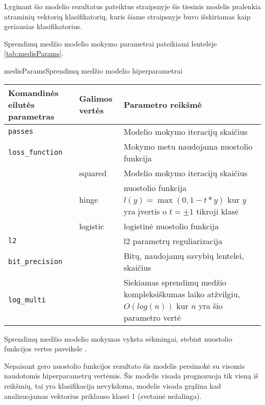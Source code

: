 
Lyginant šio modelio rezultatus pateiktus \cite{comp} straipsnyje šis tiesinis modelis pralenkia
atraminių vektorių klasifikatorių, kuris šiame straipsnyje buvo išskiriamas kaip geriausias klasifikatorius.



Sprendimų medžio modelio mokymo parametrai pateikiami lentelėje \vref{tab:medisParams}.

\begin{ktutable}{medisParams}{Sprendimų medžio modelio hiperparametrai}
    \begin{tabular}{| l | l | p{7cm}|}
    \hline
        Komandinės eilutės parametras & Galimos vertės & Parametro reikšmė\\ \hline
        \texttt{passes} &  & Modelio mokymo iteracijų skaičius \\ \hline
        \texttt{loss\_function} &          & Mokymo metu naudojama nuostolio funkcija \\
                               & squared  & Modelio mokymo iteracijų skaičius \\
                               & hinge    & nuostolio funkcija $l(y) = \max(0, 1 - t * y)$ kur $y$ yra įvertis o $t = \pm 1$ tikroji klasė  \\
                               & logistic & logistinė nuostolio funkcija \\ \hline
        \texttt{l2} & & l2 parametrų reguliarizacija \\ \hline
        \texttt{bit\_precision} & & Bitų, naudojamų savybių lentelei, skaičius\\ \hline
        \texttt{log\_multi} & & Siekiamas sprendimų medžio kompleksiškumas laiko atžvilgiu, $O(log(n))$ kur $n$ yra šio parametro vertė\\ \hline
    \end{tabular}
\end{ktutable}

Sprendimų medžio modelio mokymas vyksta sėkmingai, stebint nuostolio funkcijos vertes paveiksle .

Nepaisant gero nuostolio funkcijos rezultato šis modelis persimokė su visomis naudotomis
hiperparametrų vertėmis. Šis modelis visada prognozuoja tik vieną iš reikšmių, tai yra
klasifikacija nevykdoma, modelis visada grąžina kad analizuojamas vektorius priklauso klasei 1 (svetainė nežalinga).

